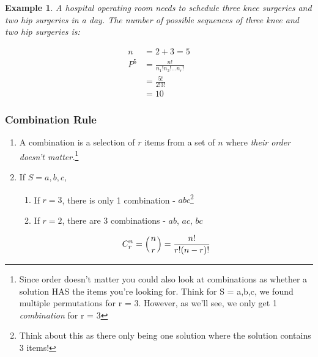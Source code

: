 \documentclass[../IND E 315.tex]{subfiles}
\newtheorem{exmp}{Example}
\begin{document}
\begin{exmp}
    A hospital operating room needs to schedule three knee surgeries and
    two hip surgeries in a day. The number of possible sequences of three knee and two hip surgeries is:
\end{exmp}
\begin{equation*}
    \begin{aligned}
        n &= 2 + 3 = 5 \\
        P^5 &= \frac{n!}{n_1! n_2! \dots n_r!} \\
            &= \frac{5!}{2!3!} \\
            &= 10
    \end{aligned}
\end{equation*}

\subsubsection*{Combination Rule}
\begin{enumerate}
    \item A combination is a selection of $r$ items from a set of $n$ where \emph{their order doesn't matter.}\footnote{Since order doesn't matter you could also look at combinations as whether a solution HAS the items you're looking for. Think for S = {a,b,c}, we found multiple permutations for r = 3. However, as we'll see, we only get 1 \emph{combination} for r = 3}
    \item If $S = {a,b,c}$,
        \begin{enumerate}
            \item If $r = 3$, there is only 1 combination - $abc$\footnote{Think about this as there only being one solution where the solution contains 3 items!}
            \item If $r = 2$, there are 3 combinations - $ab$, $ac$, $bc$
        \end{enumerate}
        \begin{equation*}
            \begin{aligned}
                C^n_r = \left(n \atop r\right) = \frac{n!}{r!(n-r)!} 
            \end{aligned}
        \end{equation*}
\end{enumerate}
\end{document}
